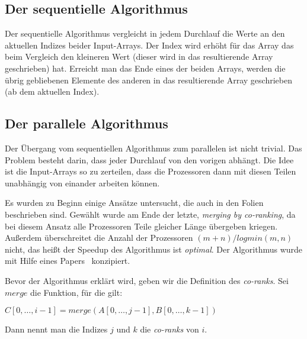 \subsection{Der sequentielle Algorithmus}
Der sequentielle Algorithmus vergleicht in jedem Durchlauf die Werte an den aktuellen Indizes beider Input-Arrays. Der Index wird erhöht für das Array das beim Vergleich den kleineren Wert (dieser wird in das resultierende Array geschrieben) hat. Erreicht man das Ende eines der beiden Arrays, werden die übrig gebliebenen Elemente des anderen in das resultierende Array geschrieben (ab dem aktuellen Index).

\subsection{Der parallele Algorithmus}
Der Übergang vom sequentiellen Algorithmus zum parallelen ist nicht trivial. Das Problem besteht darin, dass jeder Durchlauf von den vorigen abhängt. Die Idee ist die Input-Arrays so zu zerteilen, dass die Prozessoren dann mit diesen Teilen unabhängig von einander arbeiten können.

Es wurden zu Beginn einige Ansätze untersucht, die auch in den Folien beschrieben sind. Gewählt wurde am Ende der letzte, \emph{merging by co-ranking}, da bei diesem Ansatz alle Prozessoren Teile gleicher Länge übergeben kriegen. Außerdem überschreitet die Anzahl der Prozessoren $(m+n) / log min(m,n)$ nicht, das heißt der Speedup des Algorithmus ist \emph{optimal}. Der Algorithmus wurde mit Hilfe eines Papers~\cite{corank} konzipiert.

Bevor der Algorithmus erklärt wird, geben wir die Definition des \emph{co-ranks}. Sei $merge$ die Funktion, für die gilt:
\begin{center}
$C[0,\dots,i-1] = merge(A[0,\dots,j-1], B[0,\dots,k-1])$
\end{center}
Dann nennt man die Indizes $j$ und $k$ die \emph{co-ranks} von $i$.